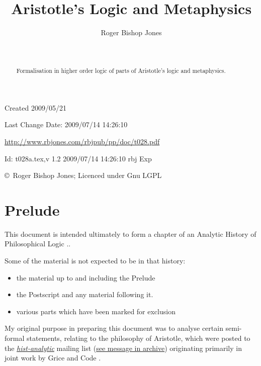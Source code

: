 \documentclass[11pt]{article}
\title{Aristotle's Logic and Metaphysics}
\author{Roger Bishop Jones}
\date{\ }
\begin{document}
\begin{titlepage}
\maketitle
\begin{abstract}
Formalisation in higher order logic of parts of Aristotle's logic and metaphysics.
\end{abstract}
\vfill

\begin{centering}
{\footnotesize

Created 2009/05/21

Last Change $ $Date: 2009/07/14 14:26:10 $ $

\href{http://www.rbjones.com/rbjpub/pp/doc/t028.pdf}
{http://www.rbjones.com/rbjpub/pp/doc/t028.pdf}

$ $Id: t028a.tex,v 1.2 2009/07/14 14:26:10 rbj Exp $ $

\copyright\ Roger Bishop Jones; Licenced under Gnu LGPL

}%
\end{centering}

\thispagestyle{empty}
\end{titlepage}

\newpage
\addtocounter{page}{1}
{\parskip=0pt\tableofcontents}

\section{Prelude}

This document is intended ultimately to form a chapter of an Analytic History of Philosophical Logic \cite{rbjb001}..

Some of the material is not expected to be in that history:
\begin{itemize}
\item the material up to and including the Prelude
\item the Postscript and any material following it.
\item various parts which have been marked for exclusion
\end{itemize}

My original purpose in preparing this document was to analyse certain semi-formal statements, relating to the philosophy of Aristotle, which were posted to the \href{http://hist-analytic.org}{\it hist-analytic} mailing list (\href{http://rbjones.com/pipermail/hist-analytic_rbjones.com/2009q2/000258.html}{see message in archive}) originating primarily in joint work by Grice \cite{grice88} and Code \cite{code88}.
\end{document}

